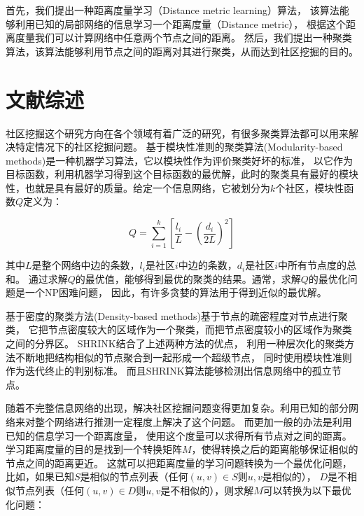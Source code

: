 首先，我们提出一种距离度量学习（Distance metric learning）算法，
该算法能够利用已知的局部网络的信息学习一个距离度量（Distance metric），
根据这个距离度量我们可以计算网络中任意两个节点之间的距离。
然后，我们提出一种聚类算法，该算法能够利用节点之间的距离对其进行聚类，从而达到社区挖掘的目的。

\section{文献综述}

社区挖掘这个研究方向在各个领域有着广泛的研究，有很多聚类算法都可以用来解决特定情况下的社区挖掘问题。
基于模块性准则的聚类算法(Modularity-based methods)是一种机器学习算法，它以模块性作为评价聚类好坏的标准，
以它作为目标函数，利用机器学习得到这个目标函数的最优解，此时的聚类具有最好的模块性，也就是具有最好的质量。给定一个信息网络，它被划分为$k$个社区，模块性函数$Q$定义为：

\begin{equation}
Q = \sum_{i=1}^{k}[ \frac{l_i}{L} - (\frac{d_i}{2L})^2]
\end{equation}

其中$L$是整个网络中边的条数，$l_i$是社区$i$中边的条数，$d_i$是社区$i$中所有节点度的总和。
通过求解$Q$的最优值，能够得到最优的聚类的结果。通常，求解$Q$的最优化问题是一个NP困难问题，
因此，有许多贪婪的算法用于得到近似的最优解。

基于密度的聚类方法(Density-based methods)基于节点的疏密程度对节点进行聚类，
它把节点密度较大的区域作为一个聚类，而把节点密度较小的区域作为聚类之间的分界区。
SHRINK结合了上述两种方法的优点，
利用一种层次化的聚类方法不断地把结构相似的节点聚合到一起形成一个超级节点，
同时使用模块性准则作为迭代终止的判别标准。
而且SHRINK算法能够检测出信息网络中的孤立节点。

随着不完整信息网络的出现，解决社区挖掘问题变得更加复杂。利用已知的部分网络来对整个网络进行推测一定程度上解决了这个问题。
而更加一般的办法是利用已知的信息学习一个距离度量，
使用这个度量可以求得所有节点对之间的距离。
学习距离度量的目的是找到一个转换矩阵$M$，使得转换之后的距离能够保证相似的节点之间的距离更近。
这就可以把距离度量的学习问题转换为一个最优化问题，比如，如果已知$S$是相似的节点列表（任何$(u, v) \in S$则$u, v$是相似的），
$D$是不相似节点列表（任何$(u, v) \in D$则$u, v$是不相似的），则求解$M$可以转换为以下最优化问题：

